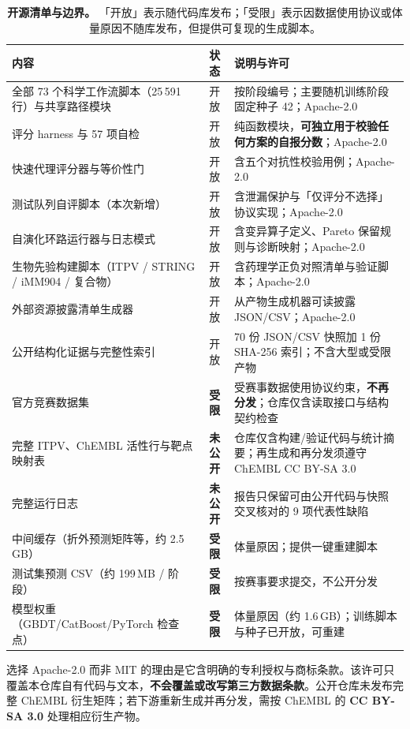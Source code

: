 \begin{table}[H]
\centering\footnotesize
\caption{\textbf{开源清单与边界。} 「开放」表示随代码库发布；「受限」表示因数据使用协议或体量原因不随库发布，但提供可复现的生成脚本。}
\label{tab:oss}
\begin{tabularx}{\textwidth}{@{}R{5.5cm}cX@{}}
\toprule
内容 & 状态 & 说明与许可 \\
\midrule
全部 73 个科学工作流脚本（25\,591 行）与共享路径模块 & 开放 & 按阶段编号；主要随机训练阶段固定种子 42；Apache-2.0 \\
评分 harness 与 57 项自检 & 开放 & 纯函数模块，\textbf{可独立用于校验任何方案的自报分数}；Apache-2.0 \\
快速代理评分器与等价性门 & 开放 & 含五个对抗性校验用例；Apache-2.0 \\
测试队列自评脚本（本次新增） & 开放 & 含泄漏保护与「仅评分不选择」协议实现；Apache-2.0 \\
自演化环路运行器与日志模式 & 开放 & 含变异算子定义、Pareto 保留规则与诊断映射；Apache-2.0 \\
生物先验构建脚本（ITPV / STRING / iMM904 / 复合物） & 开放 & 含药理学正负对照清单与验证脚本；Apache-2.0 \\
外部资源披露清单生成器 & 开放 & 从产物生成机器可读披露 JSON/CSV；Apache-2.0 \\
公开结构化证据与完整性索引 & 开放 & 70 份 JSON/CSV 快照加 1 份 SHA-256 索引；不含大型或受限产物 \\
\midrule
官方竞赛数据集 & \textbf{受限} & 受赛事数据使用协议约束，\textbf{不再分发}；仓库仅含读取接口与结构契约检查 \\
完整 ITPV、ChEMBL 活性行与靶点映射表 & \textbf{未公开} & 仓库仅含构建/验证代码与统计摘要；再生成和再分发须遵守 ChEMBL CC BY-SA 3.0 \\
完整运行日志 & \textbf{未公开} & 报告只保留可由公开代码与快照交叉核对的 9 项代表性缺陷 \\
中间缓存（折外预测矩阵等，约 2.5\,GB） & \textbf{受限} & 体量原因；提供一键重建脚本 \\
测试集预测 CSV（约 199\,MB / 阶段） & \textbf{受限} & 按赛事要求提交，不公开分发 \\
模型权重（GBDT/CatBoost/PyTorch 检查点） & \textbf{受限} & 体量原因（约 1.6\,GB）；训练脚本与种子已开放，可重建 \\
\bottomrule
\end{tabularx}
\end{table}

选择 Apache-2.0 而非 MIT 的理由是它含明确的专利授权与商标条款。该许可只覆盖本仓库自有代码与文本，\textbf{不会覆盖或改写第三方数据条款}。公开仓库未发布完整 ChEMBL 衍生矩阵；若下游重新生成并再分发，需按 ChEMBL 的 \textbf{CC BY-SA 3.0} 处理相应衍生产物。

